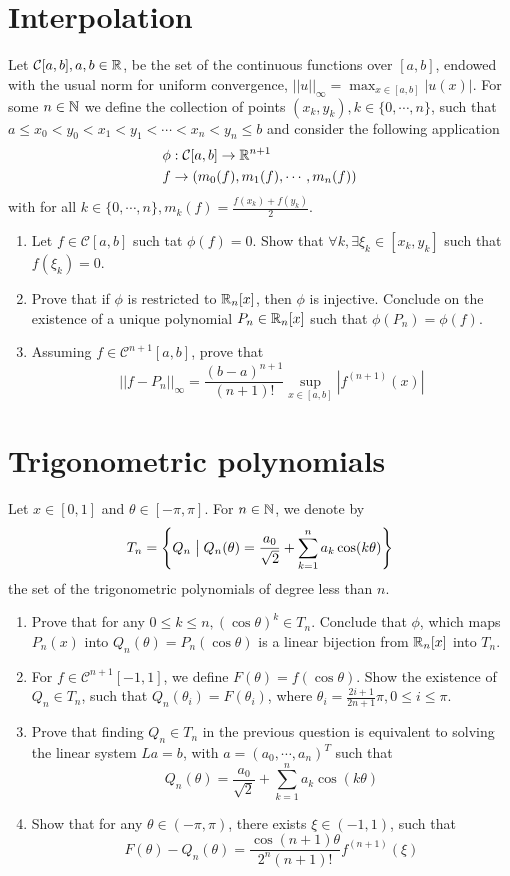\section{Interpolation}
Let \(\mathcal{C}[a,b], a,b\in\mathbb{R}\), be the set of the continuous functions over \([a,b]\), endowed with the usual norm for uniform convergence, \(||u||_\infty=\max_{x\in[a,b]}|u(x)|\).
For some \(n\in\mathbb{N}\) we define the collection of points \((x_k,y_k), k\in\{0,\cdots,n\}\), such that \(a\leq x_0<y_0<x_1<y_1<\cdots<x_n<y_n\leq b\) and consider the following application
\begin{align*}
	\phi&:\mathcal{C}[a,b]\to\mathbb{R}^{n+1}\\
	f&\to(m_0(f),m_1(f),\cdots,m_n(f))
\end{align*}
with for all \(k\in\{0,\cdots,n\},m_k(f)=\frac{f(x_k)+f(y_k)}{2}\).
\begin{enumerate}
	\item Let \(f\in\mathcal{C}[a,b]\) such tat \(\phi(f)=0\).
	Show that \(\forall k,\exists\xi_k\in[x_k,y_k]\) such that \(f(\xi_k)=0\).
	\item Prove that if $\phi$ is restricted to \(\mathbb{R}_n[x]\), then $\phi$ is injective.
	Conclude on the existence of a unique polynomial \(P_n\in\mathbb{R}_n[x]\) such that \(\phi(P_n)=\phi(f)\).
	\item Assuming \(f\in\mathcal{C}^{n+1}[a,b]\), prove that
	\[ ||f-P_n||_\infty=\frac{(b-a)^{n+1}}{(n+1)!}\sup_{x\in[a,b]}|f^{(n+1)}(x)| \]
\end{enumerate}

\section{Trigonometric polynomials}
Let \(x\in[0,1]\) and \(\theta\in[-\pi,\pi]\).
For \(n\in\mathbb{N}\), we denote by
\[T_n=\Sets{Q_n}{Q_n(\theta)=\frac{a_0}{\sqrt{2}}+\sum_{k=1}^n a_k\cos(k\theta)} \]
the set of the trigonometric  polynomials of degree less than $n$.
\begin{enumerate}
	\item Prove that for any \(0\leq k\leq n, (\cos\theta)^k\in T_n\).
	Conclude that $\phi$, which maps \(P_n(x)\) into \(Q_n(\theta)=P_n(\cos\theta)\) is a linear bijection from \(\mathbb{R}_n[x]\) into $T_n$.
	\item For \(f\in\mathcal{C}^{n+1}[−1,1]\), we define \(F(\theta)=f(\cos\theta)\).
	Show the existence of \(Q_n\in T_n\), such that \(Q_n(\theta_i)=F(\theta_i)\), where \(\theta_i=\frac{2i+1}{2n+1}\pi,0\leq i\leq\pi\).
	\item Prove that finding \(Q_n\in T_n\) in the previous question is equivalent to solving the linear system \(La=b\), with \(a=(a_0,\cdots,a_n)^T\) such that
	\[ Q_n(\theta)=\frac{a_0}{\sqrt{2}}+\sum_{k=1}^n a_k\cos(k\theta) \]
	\item Show that for any \(\theta\in(-\pi,\pi)\), there exists \(\xi\in(-1,1)\), such that
	\[ F(\theta)-Q_n(\theta)=\frac{\cos(n+1)\theta}{2^n(n+1)!}f^{(n+1)}(\xi) \]
\end{enumerate}